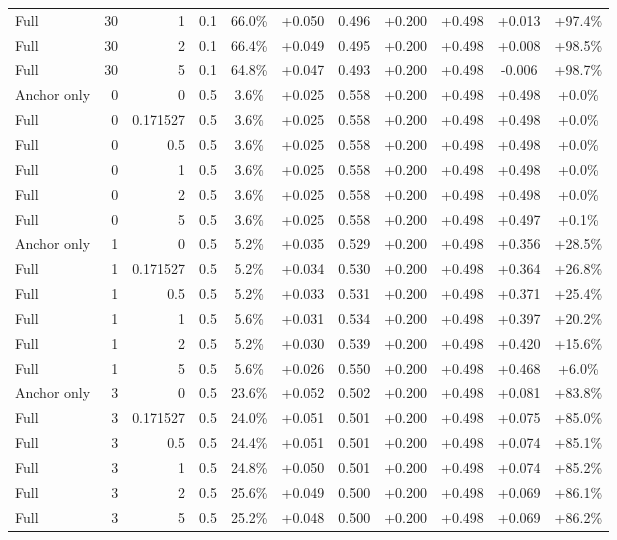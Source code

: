 \begin{table}[htbp]
\begin{tabular}{lrrrccccccc}
Full & 30 & 1 & 0.1 & 66.0\% & +0.050 & 0.496 & +0.200 & +0.498 & +0.013 & +97.4\% \\
Full & 30 & 2 & 0.1 & 66.4\% & +0.049 & 0.495 & +0.200 & +0.498 & +0.008 & +98.5\% \\
Full & 30 & 5 & 0.1 & 64.8\% & +0.047 & 0.493 & +0.200 & +0.498 & -0.006 & +98.7\% \\
Anchor only & 0 & 0 & 0.5 & 3.6\% & +0.025 & 0.558 & +0.200 & +0.498 & +0.498 & +0.0\% \\
Full & 0 & 0.171527 & 0.5 & 3.6\% & +0.025 & 0.558 & +0.200 & +0.498 & +0.498 & +0.0\% \\
Full & 0 & 0.5 & 0.5 & 3.6\% & +0.025 & 0.558 & +0.200 & +0.498 & +0.498 & +0.0\% \\
Full & 0 & 1 & 0.5 & 3.6\% & +0.025 & 0.558 & +0.200 & +0.498 & +0.498 & +0.0\% \\
Full & 0 & 2 & 0.5 & 3.6\% & +0.025 & 0.558 & +0.200 & +0.498 & +0.498 & +0.0\% \\
Full & 0 & 5 & 0.5 & 3.6\% & +0.025 & 0.558 & +0.200 & +0.498 & +0.497 & +0.1\% \\
Anchor only & 1 & 0 & 0.5 & 5.2\% & +0.035 & 0.529 & +0.200 & +0.498 & +0.356 & +28.5\% \\
Full & 1 & 0.171527 & 0.5 & 5.2\% & +0.034 & 0.530 & +0.200 & +0.498 & +0.364 & +26.8\% \\
Full & 1 & 0.5 & 0.5 & 5.2\% & +0.033 & 0.531 & +0.200 & +0.498 & +0.371 & +25.4\% \\
Full & 1 & 1 & 0.5 & 5.6\% & +0.031 & 0.534 & +0.200 & +0.498 & +0.397 & +20.2\% \\
Full & 1 & 2 & 0.5 & 5.2\% & +0.030 & 0.539 & +0.200 & +0.498 & +0.420 & +15.6\% \\
Full & 1 & 5 & 0.5 & 5.6\% & +0.026 & 0.550 & +0.200 & +0.498 & +0.468 & +6.0\% \\
Anchor only & 3 & 0 & 0.5 & 23.6\% & +0.052 & 0.502 & +0.200 & +0.498 & +0.081 & +83.8\% \\
Full & 3 & 0.171527 & 0.5 & 24.0\% & +0.051 & 0.501 & +0.200 & +0.498 & +0.075 & +85.0\% \\
Full & 3 & 0.5 & 0.5 & 24.4\% & +0.051 & 0.501 & +0.200 & +0.498 & +0.074 & +85.1\% \\
Full & 3 & 1 & 0.5 & 24.8\% & +0.050 & 0.501 & +0.200 & +0.498 & +0.074 & +85.2\% \\
Full & 3 & 2 & 0.5 & 25.6\% & +0.049 & 0.500 & +0.200 & +0.498 & +0.069 & +86.1\% \\
Full & 3 & 5 & 0.5 & 25.2\% & +0.048 & 0.500 & +0.200 & +0.498 & +0.069 & +86.2\% \\

\end{tabular}
\end{table}
